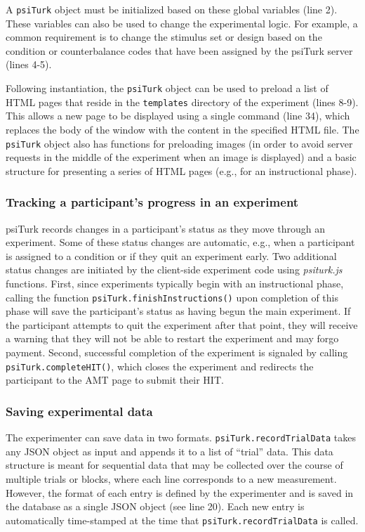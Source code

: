 \documentclass[twocolumn]{svjour3}          %
\newcommand{\psiturk}[0]{\textsf{psiTurk}}
\newcommand{\psiturkjs}[0]{\emph{psiturk.js}}
\begin{document}
A \texttt{psiTurk} object must be initialized based on these global variables (line 2).
These variables can also be used to change the experimental logic.
For example, a common requirement is to change the stimulus set or design based on the condition or counterbalance codes that have been assigned by the \psiturk{} server (lines 4-5).

Following instantiation, the \texttt{psiTurk} object can be used to preload a list of HTML pages that reside in the \texttt{templates} directory of the experiment (lines 8-9).
This allows a new page to be displayed using a single command (line 34), which replaces the body of the window with the content in the specified HTML file.
The \texttt{psiTurk} object also has functions for preloading images (in order to avoid server requests in the middle of the experiment when an image is displayed) and a basic structure for presenting a series of HTML pages (e.g., for an instructional phase).

\subsubsection{Tracking a participant's progress in an experiment} 

\psiturk{} records changes in a participant's status as they move through an experiment. 
Some of these status changes are automatic, e.g., when a participant is assigned to a condition or if they quit an experiment early. 
Two additional status changes are initiated by the client-side experiment code using \psiturkjs{} functions.
First, since experiments typically begin with an instructional phase, calling the function \texttt{psiTurk.finishInstructions()} upon completion of this phase will save the participant's status as having begun the main experiment.
If the participant attempts to quit the experiment after that point, they will receive a warning that they will not be able to restart the experiment and may forgo payment.
Second, successful completion of the experiment is signaled by calling \texttt{psiTurk.completeHIT()}, which closes the experiment and redirects the participant to the AMT page to submit their HIT.

\subsubsection{Saving experimental data} 

The experimenter can save data in two formats.
\texttt{psiTurk.recordTrialData} takes any JSON object as input and appends it to a list of ``trial'' data.
This data structure is meant for sequential data that may be collected over the course of multiple trials or blocks, where each line corresponds to a new measurement.
However, the format of each entry is defined by the experimenter and is saved in the database as a single JSON object (see line 20).
Each new entry is automatically time-stamped at the time that \texttt{psiTurk.recordTrialData} is called.
\end{document}
